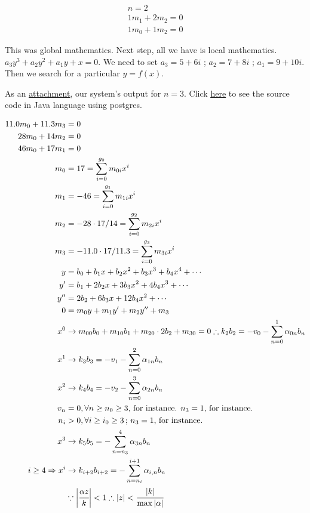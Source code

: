 \documentclass[12pt,a4paper]{article}
\begin{document}
\vspace{3mm}

\begin{align}
n = 2 \\
1 m_1 + 2 m_2 = 0 \\
1 m_0 + 1 m_2 = 0
\end{align}

This was global mathematics. Next step, all we have is local mathematics. $a_3 y^3 + a_2 y^2 + a_1 y + x = 0.$ We need to set $a_3 = 5 + 6i$ ; $a_2 = 7 + 8i$ ; $a_1 = 9 + 10i$. Then we search for a particular $y = f(x)$.

As an \href{http://boralaemcasa.herokuapp.com/anyDegree/3.txt}{\color{blue}\underline{attachment}}, our system's output for $n = 3$. Click \href{https://www.dropbox.com/s/brzk6bpa1qe2exa/anyDegree.zip?dl=0}{\color{blue}\underline{here}} to see the source code in Java language using postgres.

\begin{align}
11.0 m_0 + 11.3 m_3 &= 0 \\
28 m_0 + 14 m_2 &= 0 \\
46 m_0 + 17 m_1 &= 0 \\
m_0 &= 17 = \sum_{i = 0}^{g_0} m_{0i}x^i  \\
m_1 &= -46 = \sum_{i = 0}^{g_1} m_{1i}x^i \\
m_2 &= - 28 \cdot 17 / 14 = \sum_{i = 0}^{g_2} m_{2i}x^i \\
m_3 &= - 11.0 \cdot 17 / 11.3 = \sum_{i = 0}^{g_3} m_{3i}x^i \\
  y &=   b_0 +   b_1 x +    b_2 x^2 +   b_3 x^3 + b_4 x^4 + \cdots \\
 y' &=   b_1 + 2 b_2 x +  3 b_3 x^2 + 4 b_4 x^3 + \cdots \\
y'' &= 2 b_2 + 6 b_3 x + 12 b_4 x^2 + \cdots \\
  0 &= m_0 y + m_1 y' + m_2 y'' + m_3 \\
x^0 &\to m_{00} b_0 + m_{10} b_1 + m_{20} \cdot 2b_2 + m_{30} = 0 \therefore k_2 b_2 = - v_0 - \sum_{n = 0}^1 \alpha_{0n} b_n \\
x^1 &\to k_3 b_3 = - v_1 - \sum_{n = 0}^2 \alpha_{1n} b_n \\
x^2 &\to k_4 b_4 = - v_2 - \sum_{n = 0}^3 \alpha_{2n} b_n \\
v_n &= 0, \forall n \ge n_0 \ge 3\text{, for instance. }n_3 = 1\text{, for instance.} \\
n_i &> 0, \forall i \ge i_0 \ge 3\,;\, n_3 = 1\text{, for instance.} \\
x^3 &\to k_5 b_5 = - \sum_{n = n_3}^4 \alpha_{3n} b_n \\
i \ge 4 \Rightarrow x^i &\to k_{i+2} b_{i+2} = - \sum_{n = n_i}^{i + 1} \alpha_{i,n} b_n \\
&\because \bigg\vert \cfrac{\alpha z}{k} \bigg\vert < 1 \therefore |z| < \cfrac{|k|}{\max |\alpha|}
\end{align}
\end{document}
